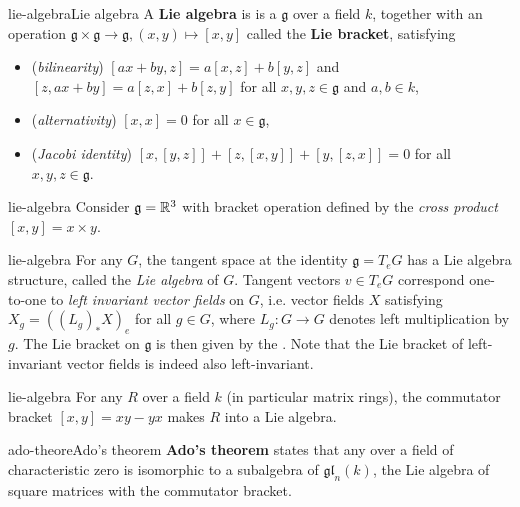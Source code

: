 \begin{topic}{lie-algebra}{Lie algebra}
    A \textbf{Lie algebra} is is a  $\mathfrak{g}$ over a field $k$, together with an operation $\mathfrak{g} \times \mathfrak{g} \to \mathfrak{g}, (x, y) \mapsto [x, y]$ called the \textbf{Lie bracket}, satisfying
    \begin{itemize}
        \item (\textit{bilinearity}) $[ax + by, z] = a[x, z] + b[y, z]$ and $[z, ax + by] = a[z, x] + b[z, y]$ for all $x, y, z \in \mathfrak{g}$ and $a, b \in k$,
        \item (\textit{alternativity}) $[x, x] = 0$ for all $x \in \mathfrak{g}$,
        \item (\textit{Jacobi identity}) $[x, [y, z]] + [z, [x, y]] + [y, [z, x]] = 0$ for all $x, y, z \in \mathfrak{g}$.
    \end{itemize}
\end{topic}

\begin{example}{lie-algebra}
    Consider $\mathfrak{g} = \mathbb{R}^3$ with bracket operation defined by the \textit{cross product} $[x, y] = x \times y$.
\end{example}

\begin{example}{lie-algebra}
    For any  $G$, the tangent space at the identity $\mathfrak{g} = T_e G$ has a Lie algebra structure, called the \textit{Lie algebra} of $G$. Tangent vectors $v \in T_e G$ correspond one-to-one to \textit{left invariant vector fields} on $G$, i.e. vector fields $X$ satisfying $X_g = ((L_g)_* X)_e$ for all $g \in G$, where $L_g : G \to G$ denotes left multiplication by $g$. The Lie bracket on $\mathfrak{g}$ is then given by the . Note that the Lie bracket of left-invariant vector fields is indeed also left-invariant.
\end{example}

\begin{example}{lie-algebra}
    For any  $R$ over a field $k$ (in particular matrix rings), the commutator bracket $[x, y] = xy - yx$ makes $R$ into a Lie algebra.
\end{example}

\begin{topic}{ado-theore}{Ado's theorem}
    \textbf{Ado's theorem} states that any  over a field of characteristic zero is isomorphic to a subalgebra of $\mathfrak{gl}_n(k)$, the Lie algebra of square matrices with the commutator bracket.
\end{topic}


